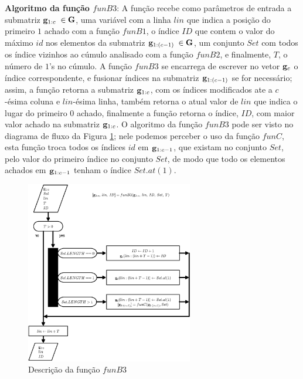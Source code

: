 \textbf{Algoritmo da função $funB3$}:
A função recebe como parâmetros de entrada a submatriz $\VECTOR{g}_{1:c}$ $\in\MATRIX{G}$, 
uma variável com a linha $lin$ que indica a posição do primeiro $1$ achado com a função $funB1$,
o índice $ID$ que contem o valor do máximo $id$ nos elementos da submatriz $\VECTOR{g}_{1:(c-1)}$ $\in\MATRIX{G}$,
um conjunto $Set$ com todos os índice vizinhos ao cúmulo analisado com a função $funB2$,
e finalmente, $T$, o número de $1$'s no cúmulo.
A função $funB3$ se encarrega de escrever no vetor $\VECTOR{g}_{c}$ o índice correspondente,
e fusionar índices na submatriz $\VECTOR{g}_{1:(c-1)}$ se for necessário;
assim, a função retorna a submatriz $\VECTOR{g}_{1:c}$, com os índices modificados ate a $c$-ésima coluna 
e $lin$-ésima linha, também retorna o atual valor de $lin$ que indica o lugar do primeiro $0$ achado,
finalmente a função retorna o índice, $ID$, com maior valor achado na submatriz  $\VECTOR{g}_{1:c}$.
O algoritmo da função $funB3$ pode ser visto no diagrama de fluxo da Figura \ref{fig:funB3};
nele podemos perceber o uso da função $funC$,
esta função troca todos os índices $id$ em $\VECTOR{g}_{1:c-1}$, que existam no conjunto $Set$,
pelo valor do primeiro índice no conjunto $Set$, de modo que todo os elementos achados em 
$\VECTOR{g}_{1:c-1}$ tenham o índice $Set.at(1)$.
\begin{figure}[!htb]
\centering
\includegraphics[width=0.65\textwidth]{section-cumulos/funB3.eps}
\caption{Descrição da função $funB3$ }
\label{fig:funB3}
\end{figure}

